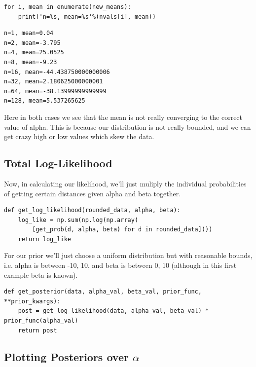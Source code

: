 \documentclass[11pt]{article}
\begin{document}
\begin{verbatim}
for i, mean in enumerate(new_means):
    print('n=%s, mean=%s'%(nvals[i], mean))
\end{verbatim}

\begin{verbatim}
n=1, mean=0.04
n=2, mean=-3.795
n=4, mean=25.0525
n=8, mean=-9.23
n=16, mean=-44.438750000000006
n=32, mean=2.180625000000001
n=64, mean=-38.13999999999999
n=128, mean=5.537265625
\end{verbatim}

Here in both cases we see that the mean is not really converging to the correct
value of alpha. This is because our distribution is not really bounded, and we
can get crazy high or low values which skew the data.

\subsection*{Total Log-Likelihood}
\label{sec-2-3}

Now, in calculating our likelihood, we'll just muliply the individual
probabilities of getting certain distances given alpha and beta together.

\begin{verbatim}
def get_log_likelihood(rounded_data, alpha, beta):
    log_like = np.sum(np.log(np.array(
        [get_prob(d, alpha, beta) for d in rounded_data])))
    return log_like
\end{verbatim}


For our prior we'll just choose a uniform distribution but with reasonable
bounds, i.e. alpha is between -10, 10, and beta is between 0, 10 (although in
this first example beta is known).

\begin{verbatim}
def get_posterior(data, alpha_val, beta_val, prior_func, **prior_kwargs):
    post = get_log_likelihood(data, alpha_val, beta_val) * prior_func(alpha_val)
    return post
\end{verbatim}

\subsection*{Plotting Posteriors over $\alpha$}
\label{sec-2-4}
\end{document}

